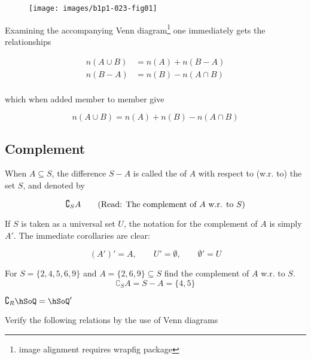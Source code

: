 \documentclass[11pt]{amsbook}
\begin{document}



\begin{wrapfigure}[3]{r}{0.25\textwidth}
	\texttt{[image: images/b1p1-023-fig01]}
\end{wrapfigure}

Examining the accompanying Venn diagram\footnote{image alignment requires wrapfig package} one immediately gets the relationships 

\begin{align*}
	n(A \cup B) &= n(A) + n(B-A)\\
	n(B-A) &= n(B) - n(A \cap B)\\
\end{align*}

\noindent which when added member to member give

\begin{equation*}
	n(A \cup B) = n(A) + n(B) - n(A \cap B)
\end{equation*}

\subsection{Complement}
	When $A \subseteq S$, the difference $S - A$ is called the  of $A$ with 
	respect to (w.r. to) the set $S$, and denoted by

\begin{equation*}
	\complement_{S} A \textrm{\quad\quad (Read: The complement of $A$ w.r. to $S$)}
\end{equation*}

If $S$ is taken as a universal set $U$, the notation for the complement of
$A$ is simply $A'$. The immediate corollaries are clear:

\begin{equation*}
	(A')' = A, \quad\quad U' = \emptyset, \quad\quad \emptyset' = U
\end{equation*}

\begin{exmp}
	For $S = \{2, 4, 5, 6, 9\}$ and $A = \{2, 6, 9\} \subseteq S$ find the complement of $A$ w.r. to $S$.\\
	\begin{equation*}
		\complement_{S} A = S - A = \{4, 5\}
	\end{equation*}
\end{exmp}

\begin{exmp}
	$\complement_{R} \hSoQ = \hSoQ'$
\end{exmp}

\begin{exmp}
	Verify the following relations by the use of Venn diagrams
\end{exmp}

\end{document}
